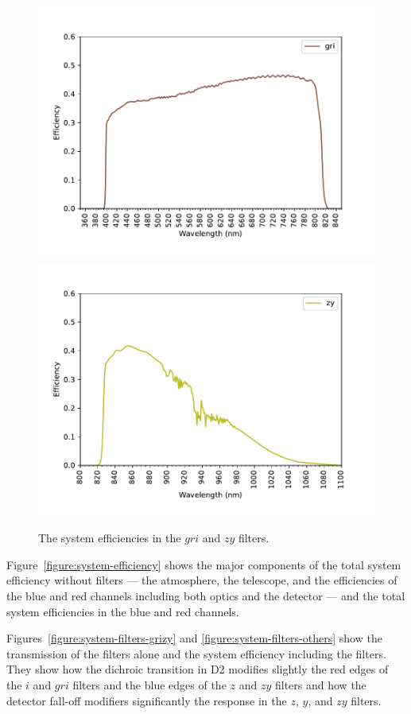 \begin{figure}
\centering
\includegraphics[width=0.80\linewidth]{figure/system-gri.pdf}
\includegraphics[width=0.80\linewidth]{figure/system-zy.pdf}
\caption{The system efficiencies in the $gri$ and $zy$ filters.}
\label{figure:system-filters-last}
\end{figure}

Figure~\ref{figure:system-efficiency} shows the major components of the total system efficiency without filters --- the atmosphere, the telescope, and the efficiencies of the blue and red channels including both optics and the detector --- and the total system efficiencies in the blue and red channels.

Figures~\ref{figure:system-filters-grizy} and \ref{figure:system-filters-others} show the transmission of the filters alone and the system efficiency including the filters. They show how the dichroic transition in D2 modifies slightly the red edges of the $i$ and $gri$ filters and the blue edges of the $z$ and $zy$ filters and how the detector fall-off modifiers significantly the response in the $z$, $y$, and $zy$ filters.

